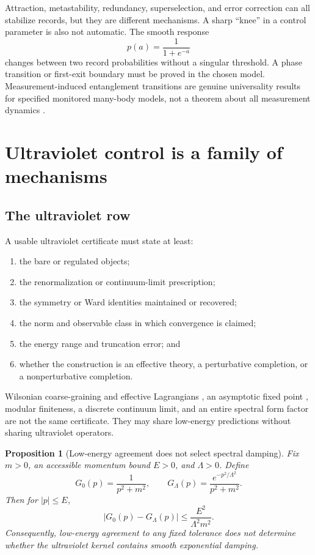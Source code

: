 \documentclass[11pt]{article}
\newtheorem{proposition}[theorem]{Proposition}
\theoremstyle{definition}
\theoremstyle{remark}
\begin{document}
Attraction, metastability, redundancy, superselection, and error correction can
all stabilize records, but they are different mechanisms. A sharp ``knee'' in
a control parameter is also not automatic. The smooth response
\[
 p(a)=\frac{1}{1+e^{-a}}
\]
changes between two record probabilities without a singular threshold. A phase
transition or first-exit boundary must be proved in the chosen model.
Measurement-induced entanglement transitions are genuine universality results
for specified monitored many-body models, not a theorem about all measurement
dynamics \cite{SkinnerRuhmanNahum2019}.

\section{Ultraviolet control is a family of mechanisms}
\label{sec:uv}

\subsection{The ultraviolet row}

A usable ultraviolet certificate must state at least:
\begin{enumerate}[label=(\arabic*)]
  \item the bare or regulated objects;
  \item the renormalization or continuum-limit prescription;
  \item the symmetry or Ward identities maintained or recovered;
  \item the norm and observable class in which convergence is claimed;
  \item the energy range and truncation error; and
  \item whether the construction is an effective theory, a perturbative
  completion, or a nonperturbative completion.
\end{enumerate}

Wilsonian coarse-graining and effective Lagrangians
\cite{WilsonKogut1974,Polchinski1984}, an asymptotic fixed point
\cite{Reuter1998}, modular finiteness, a discrete continuum limit, and an entire
spectral form factor are not the same certificate. They may share low-energy
predictions without sharing ultraviolet operators.

\begin{proposition}[Low-energy agreement does not select spectral damping]
\label{prop:uv-nonuniqueness}
Fix \(m>0\), an accessible momentum bound \(E>0\), and \(\Lambda>0\). Define
\[
 G_0(p)=\frac{1}{p^2+m^2},
 \qquad
 G_\Lambda(p)=\frac{e^{-p^2/\Lambda^2}}{p^2+m^2}.
\]
Then for \(|p|\leq E\),
\[
 |G_0(p)-G_\Lambda(p)|
 \leq \frac{E^2}{\Lambda^2m^2}.
\]
Consequently, low-energy agreement to any fixed tolerance does not determine
whether the ultraviolet kernel contains smooth exponential damping.
\end{proposition}
\end{document}
